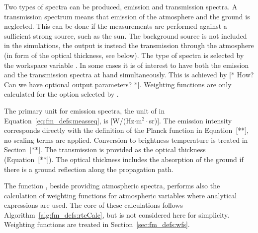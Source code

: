 Two types of spectra can be produced, emission and transmission
spectra. A transmission spectrum means that emission of the atmosphere
and the ground is neglected. This can be done if the measurements are
performed against a sufficient strong source, such as the sun. The
background source is not included in the simulations, the output is
instead the transmission through the atmosphere (in form of the
optical thickness, see below). The type of spectra is selected by the
workspace variable . In some cases it is of interest
to have both the emission and the transmission spectra at hand
simultaneously. This is achieved by [* How? Can we have optional
output parameters? *]. Weighting functions are only calculated for the
option selected by .

The primary unit for emission spectra, the unit of  in
Equation~\ref{eq:fm_defs:measseq}, is [W/(Hz$\cdot$m$^2\cdot$sr)].
The emission intensity corresponds directly with the definition of the
Planck function in Equation~[**], no scaling terms are applied.
Conversion to brightness temperature is treated in Section~[**].  The
transmission is provided as the optical thickness (Equation~[**]).
The optical thickness includes the absorption of the ground if there
is a ground reflection along the propagation path.

The function , beside providing atmospheric spectra,
performs also the calculation of weighting functions for atmospheric
variables where analytical expressions are used. The core of these
calculations follows Algorithm~\ref{alg:fm_defs:rteCalc}, but is not
considered here for simplicity. Weighting functions are treated in
Section~\ref{sec:fm_defs:wfs}.

